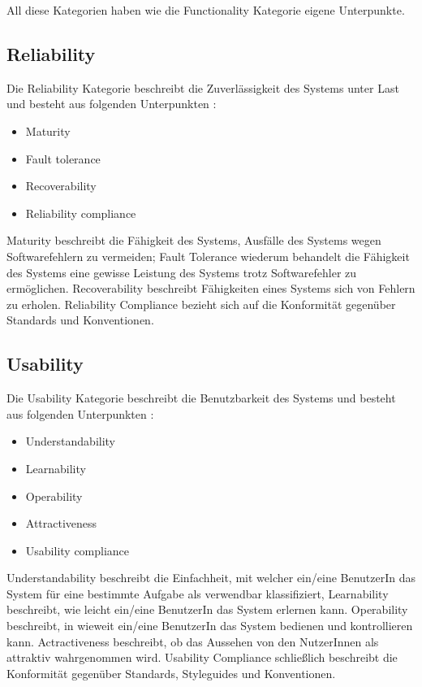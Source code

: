 All diese Kategorien haben wie die Functionality Kategorie eigene Unterpunkte.

\subsection{Reliability}
Die Reliability Kategorie beschreibt die Zuverlässigkeit des Systems unter Last und besteht aus folgenden Unterpunkten \cite[S. 7]{ISO_SQ}:

\begin{itemize}
  \item \glqq Maturity\grqq
  \item \glqq Fault tolerance\grqq
  \item \glqq Recoverability\grqq
  \item \glqq Reliability compliance\grqq
\end{itemize}

Maturity beschreibt die Fähigkeit des Systems, Ausfälle des Systems wegen Softwarefehlern zu vermeiden; Fault Tolerance wiederum behandelt die Fähigkeit des Systems eine gewisse Leistung des Systems trotz Softwarefehler zu ermöglichen. Recoverability beschreibt Fähigkeiten eines Systems  sich von Fehlern zu erholen. Reliability Compliance bezieht sich auf die Konformität gegenüber Standards und Konventionen. \cite[S. 8-9]{ISO_SQ}

\subsection{Usability}
Die Usability Kategorie beschreibt die Benutzbarkeit des Systems und besteht aus folgenden Unterpunkten \cite[S. 7]{ISO_SQ}:

\begin{itemize}
  \item \glqq Understandability\grqq
  \item \glqq Learnability\grqq
  \item \glqq Operability\grqq
  \item \glqq Attractiveness\grqq
  \item \glqq Usability compliance\grqq
\end{itemize}

Understandability beschreibt die Einfachheit, mit welcher ein/eine BenutzerIn das System für eine bestimmte Aufgabe als verwendbar klassifiziert, Learnability beschreibt, wie leicht ein/eine BenutzerIn das System erlernen kann. Operability beschreibt, in wieweit ein/eine BenutzerIn das System bedienen und kontrollieren kann. Actractiveness beschreibt, ob das Aussehen von den NutzerInnen als attraktiv wahrgenommen wird. Usability Compliance schließlich beschreibt die Konformität gegenüber Standards, Styleguides und Konventionen. \cite[S. 9-10]{ISO_SQ}

